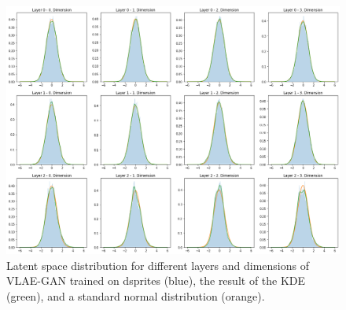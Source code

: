 \begin{figure}[H]
    \centering
    \includegraphics[width=\textwidth]{images/generated_vs_true/dsprites/vlae_gan_kde.png}
    \caption[\ac{VLAE}-\ac{GAN} on dsprites: Estimated Latent Space Distribution]{Latent space distribution for different layers and dimensions of \ac{VLAE}-\ac{GAN} trained on dsprites (blue), the result of the \ac{KDE} (green), and a standard normal distribution (orange).}
\end{figure}
